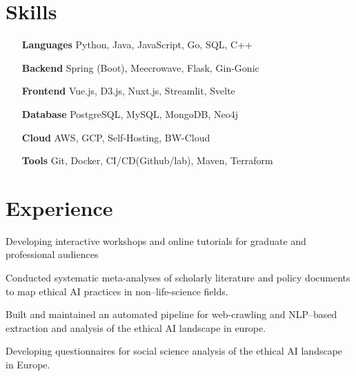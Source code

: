 \documentclass[letterpaper,10pt]{article}
\begin{document}



  \section{Skills}

  \begin{multicols}{2}
    \begin{itemize}[itemsep=-2px, parsep=1pt, leftmargin=75pt]
      \item[\textbf{Languages}] Python, Java, JavaScript, Go, SQL, C++
      \item[\textbf{Backend}] Spring (Boot), Meecrowave, Flask, Gin-Gonic 
      \item[\textbf{Frontend}] Vue.js, D3.js, Nuxt.js, Streamlit, Svelte
      \item[\textbf{Database}] PostgreSQL, MySQL, MongoDB, Neo4j
      \item[\textbf{Cloud}] AWS, GCP, Self-Hosting, BW-Cloud
      \item[\textbf{Tools}] Git, Docker, CI/CD(Github/lab), Maven, Terraform
    \end{itemize}
  \end{multicols}


  \section{Experience}

  \begin{resume_list}
    \item Developing interactive workshops and online tutorials for graduate and professional audiences
    \item Conducted systematic meta-analyses of scholarly literature and policy documents to map ethical AI practices in non–life-science fields.
    \item Built and maintained an automated pipeline for web-crawling and NLP–based extraction and analysis of the ethical AI landscape in europe.
    \item Developing questionnaires for social science analysis of the ethical AI landscape in Europe.
    \end{resume_list}
\end{document}

